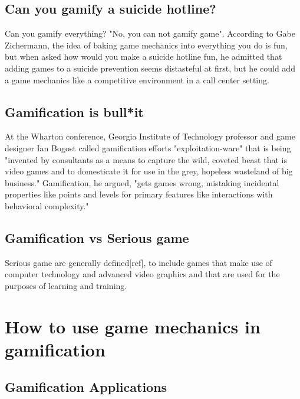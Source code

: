 \subsection{Can you gamify a suicide hotline?}
Can you gamify everything? "No, you can not gamify game". According to Gabe Zichermann, the idea of baking game mechanics into everything you do is fun, but when asked how would you make a suicide hotline fun, he admitted that adding games to a suicide prevention seems distasteful at first, but he could add a game mechanics like a competitive environment in a call center setting.

\subsection{Gamification is bull*it}
At the Wharton conference, Georgia Institute of Technology professor and game designer Ian Bogost called gamification efforts "exploitation-ware" that is being "invented by consultants as a means to capture the wild, coveted beast that is video games and to domesticate it for use in the grey, hopeless wasteland of big business." Gamification, he argued, "gets games wrong, mistaking incidental properties like points and levels for primary features like interactions with behavioral complexity."

\subsection{Gamification vs Serious game}
Serious game are generally defined[ref], to include games that make use of computer technology and advanced video graphics and that are used for the purposes of learning and training.

\section{How to use game mechanics in gamification}

\subsection{Gamification Applications}

